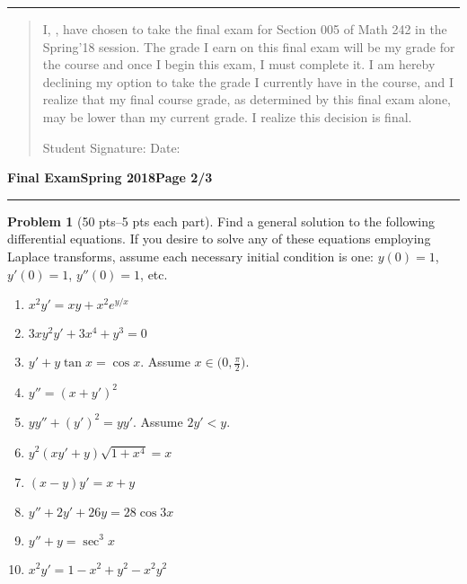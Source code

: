 \documentclass[12pt]{article}
\theoremstyle{definition}
\newtheorem{problem}{Problem}
\begin{document}
\hrule

\vspace{0.6cm}

\begin{quotation}
\noindent I, \makebox[8cm]{\hrulefill}, have chosen to take the final exam for Section 005 of Math 242 in the Spring'18 session.  The grade I earn on this final exam will be my grade for the course and once I begin this exam, I must complete it.  I am hereby declining my option to take the grade I currently have in the course, and I realize that my final course grade, as determined by this final exam alone, may be lower than my current grade.  I realize this decision is final.

\vspace{1cm}

\noindent Student Signature: \makebox[8cm]{\hrulefill} Date: \makebox[3cm]{\hrulefill}


\end{quotation}
\newpage

\hfill{\large\bf Final Exam}\hfill{\large\bf Spring 2018}\hfill{\large\bf Page 2/3}\hrule

\bigskip
\begin{problem}[50 pts--5 pts each part]
Find a general solution to the following differential equations.  If you desire to solve any of these equations employing Laplace transforms, assume each necessary initial condition is one: $y(0)=1$, $y'(0)=1$, $y''(0)=1$, etc.
\begin{enumerate}
\item $x^2y'=xy+x^2e^{y/x}$  %
\item $3xy^2y' + 3x^4+y^3 = 0$  %
\item $y'+y\tan x = \cos x$.  Assume $x \in \big( 0, \tfrac{\pi}{2} \big)$.  %
\item $y''=(x+y')^2$  %
\item $yy''+(y')^2=yy'$.  Assume $2y'<y$. %
\item $y^2(xy'+y)\sqrt{1+x^4}=x$ %
\item $(x-y)y'=x+y$ %
\item $y''+2y'+26y=28\cos 3x$ %
\item $y''+y=\sec^3 x$ %
\item $x^2y' = 1-x^2+y^2-x^2y^2$   %
\end{enumerate}
\end{problem}
\end{document}
